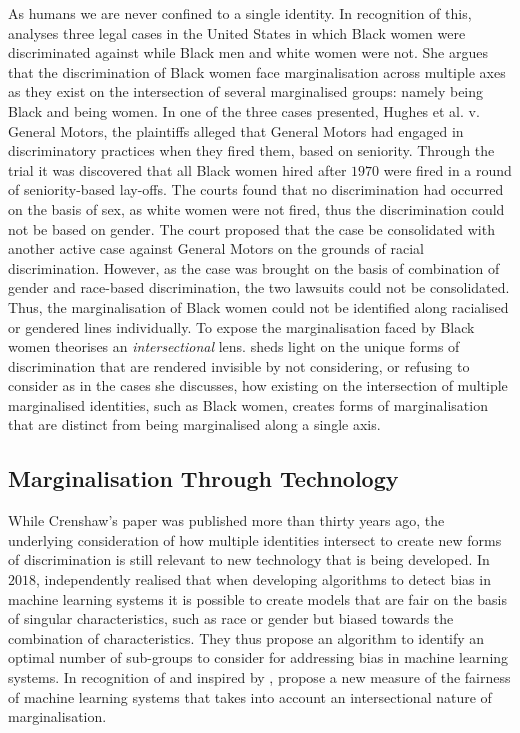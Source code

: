 As humans we are never confined to a single identity.
In recognition of this, \citet{Crenshaw:1989} analyses three legal cases in the United States in which Black women were discriminated against while Black men and white women were not.
She argues that the discrimination of Black women face marginalisation across multiple axes as they exist on the intersection of several marginalised groups: namely being Black and being women.
In one of the three cases presented, Hughes et al. v. General Motors, the plaintiffs alleged that General Motors had engaged in discriminatory practices when they fired them, based on seniority.
Through the trial it was discovered that all Black women hired after $1970$ were fired in a round of seniority-based lay-offs.
The courts found that no discrimination had occurred on the basis of sex, as white women were not fired, thus the discrimination could not be based on gender.
The court proposed that the case be consolidated with another active case against General Motors on the grounds of racial discrimination.
However, as the case was brought on the basis of combination of gender and race-based discrimination, the two lawsuits could not be consolidated. 
Thus, the marginalisation of Black women could not be identified along racialised or gendered lines individually. 
To expose the marginalisation faced by Black women \citet{Crenshaw:1989} theorises an \textit{intersectional} lens.
\citet{Crenshaw:1989} sheds light on the unique forms of discrimination that are rendered invisible by not considering, or refusing to consider as in the cases she discusses, how existing on the intersection of multiple marginalised identities, such as Black women, creates forms of marginalisation that are distinct from being marginalised along a single axis.

\subsection{Marginalisation Through Technology}

While Crenshaw's \citeyearpar{Crenshaw:1989} paper was published more than thirty years ago, the underlying consideration of how multiple identities intersect to create new forms of discrimination is still relevant to new technology that is being developed. 
In $2018$, \citet{Kearns:2018} independently realised that when developing algorithms to detect bias in machine learning systems it is possible to create models that are fair on the basis of singular characteristics, such as race or gender but biased towards the combination of characteristics.
They thus propose an algorithm to identify an optimal number of sub-groups to consider for addressing bias in machine learning systems. 
In recognition of \citet{Kearns:2018} and inspired by \citet{Crenshaw:1989}, \citet{Foulds:2019} propose a new measure of the fairness of machine learning systems that takes into account an intersectional nature of marginalisation.

